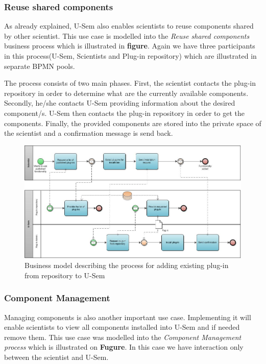 \subsubsection{Reuse shared components}

As already explained, U-Sem also enables scientists to reuse components shared by other scientist. This use case is modelled into the \textit{Reuse shared components} business process which is illustrated in \textbf{figure}. Again we have three participants in this process(U-Sem, Scientists and Plug-in repository) which are illustrated in separate BPMN pools. 

The process consists of two main phases. First, the scientist contacts the plug-in repository in order to determine what are the currently available components. Secondly, he/she contacts U-Sem providing information about the desired component/s. U-Sem then contacts the plug-in repository in order to get the components. Finally, the provided components are stored into the private space of the scientist and a confirmation message is send back.

\begin{figure}[h!]
  \centering
  	\includegraphics[scale=0.7,angle=90]{plug-in/business_processes/InstallPlugInFromRepoBusinessModel.jpg}
  \caption{Business model describing the process for adding existing plug-in from repository to U-Sem}
\end{figure}

\subsubsection{Component Management}

Managing components is also another important use case. Implementing it will enable scientists to view all components installed into U-Sem and if needed remove them. This use case was modelled into the \textit{Component Management process} which is illustrated on \textbf{Fugure}. In this case we have interaction only between the scientist and U-Sem.

